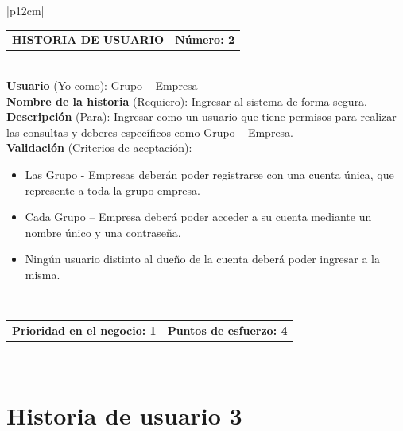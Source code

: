 \documentclass[11pt,letterpaper]{report}
\begin{document}
	\begin{center}	
	\begin{tabular}{|p{12cm}|}
		\hline
		\begin{tabular}{c|c}
			\textbf{HISTORIA DE USUARIO} & \textbf{Número: 2} \\
		\end{tabular} \\ \hline
		\textbf{Usuario} (Yo como): Grupo – Empresa \\ \hline
		\textbf{Nombre de la historia} (Requiero): Ingresar al sistema de forma segura. \\ \hline
		\textbf{Descripción} (Para): Ingresar como un usuario que tiene permisos para realizar las consultas y deberes específicos como Grupo – Empresa. \\ \hline
		\textbf{Validación} (Criterios de aceptación): \\
		\begin{minipage}{12cm}
			\begin{itemize}
				\item Las Grupo - Empresas deberán poder registrarse con una cuenta única, que represente a toda la grupo-empresa.
				\item Cada Grupo – Empresa deberá poder acceder a su cuenta mediante un nombre único y una contraseña.
				\item Ningún usuario distinto al dueño de la cuenta deberá poder ingresar a la misma.
			\end{itemize}
		\end{minipage} \\ \hline
		\begin{tabular}{c|c}
			\textbf{Prioridad en el negocio: 1} & \textbf{Puntos de esfuerzo: 4} \\
		\end{tabular} \\ \hline
	\end{tabular}
	\end{center}
	
	\section{Historia de usuario 3}
	
\end{document}
